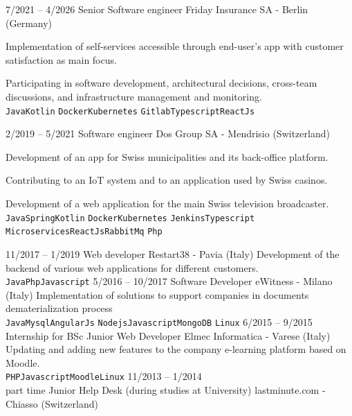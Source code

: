 \documentclass[9pt]{developercv} %
\begin{document}
\begin{entrylist}
    \entry
		{7/2021 -- 4/2026}
		{Senior Software engineer}
		{Friday Insurance SA - Berlin (Germany)}
		{Implementation of self-services accessible through end-user's app with customer satisfaction as main focus.

            Participating in software development, architectural decisions, cross-team discussions, and infrastructure management and monitoring.\\
        \texttt{Java}\slashsep\texttt{Kotlin}
        \slashsep\texttt{Docker}\slashsep\texttt{Kubernetes}
        \slashsep\texttt{Gitlab}\slashsep\texttt{Typescript}\slashsep\texttt{ReactJs}}
	\entry
		{2/2019 -- 5/2021}
		{Software engineer}
		{Dos Group SA - Mendrisio (Switzerland)}
		{Development of an app for Swiss municipalities and its back-office platform.

        Contributing to an IoT system and to an application used by Swiss casinos.
        
        Development of a web application for the main Swiss television broadcaster.\\ 
        \texttt{Java}\slashsep\texttt{Spring}\slashsep\texttt{Kotlin}
        \slashsep\texttt{Docker}\slashsep\texttt{Kubernetes}
        \slashsep\texttt{Jenkins}\slashsep\texttt{Typescript}\\
        \texttt{Microservices}\slashsep\texttt{ReactJs}\slashsep\texttt{RabbitMq}
        \slashsep\texttt{Php}}
	\entry
		{11/2017 -- 1/2019}
		{Web developer}
		{Restart38 - Pavia (Italy)}
		{Development of the backend of various web applications for different customers.
		\\ \texttt{Java}\slashsep\texttt{Php}\slashsep\texttt{Javascript}}
	\entry
		{5/2016 -- 10/2017}
		{Software Developer}
		{eWitness - Milano (Italy)}
		{Implementation of solutions to support companies in documents dematerialization process \\
        \texttt{Java}\slashsep\texttt{Mysql}\slashsep\texttt{AngularJs}
        \slashsep\texttt{Nodejs}\slashsep\texttt{Javascript}\slashsep\texttt{MongoDB}
        \slashsep\texttt{Linux}}
	\entry
		{6/2015 -- 9/2015\\\footnotesize{Internship for BSc}}
		{Junior Web Developer}
		{Elmec Informatica - Varese (Italy)}
		{Updating and adding new features to the company e-learning platform based on Moodle.\\
        \texttt{PHP}\slashsep\texttt{Javascript}\slashsep\texttt{Moodle}\slashsep\texttt{Linux}}
	\entry
		{11/2013 -- 1/2014\\\footnotesize{part time}}
		{Junior Help Desk (during studies at University)}
		{lastminute.com - Chiasso (Switzerland)}

\end{entrylist}
\end{document}

